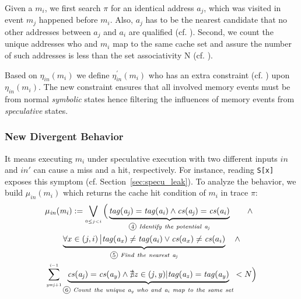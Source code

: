 \documentclass[sigconf]{acmart}
\newcommand*\circled[1]{\tikz[baseline=(char.base)]{
				\node[shape=circle,draw,inner sep=1pt] (char) {\scriptsize{#1}};}}
\begin{document}
Given a $\mathit{m_i}$, we first search $\pi$ for an identical address 
$\mathit{a_j}$, which was visited in event $\mathit{m_j}$ happened before 
$\mathit{m_i}$. Also, $\mathit{a_j}$ has to be the nearest candidate that 
no other addresses between $\mathit{a_j}$ and $\mathit{a_i}$ are qualified
(cf. \circled{1}). Second, we count the unique addresses who and $\mathit{m_i}$
map to the same cache set and assure the number of such addresses is less 
than the set associativity N (cf. \circled{2}).
%

Based on $\mathit{\eta_{in}(m_i)}$ we define $\mathit{\eta^\prime_{in}(m_i)}$
who has an extra constraint (cf. \circled{3}) upon $\mathit{\eta_{in}(m_i)}$. 
The new constraint ensures that all involved memory events must be from 
normal \textit{symbolic} states hence filtering the influences of memory 
events from \textit{speculative} states.

\subsubsection{New Divergent Behavior}
\label{sec:new_div}
It means executing $\mathit{m_i}$ under speculative execution with two different
inputs $\mathit{in}$ and $\mathit{in'}$ can cause a miss and a hit, respectively. 
For instance, reading \texttt{S[x]} exposes this symptom (cf. Section~\ref{sec:specu_leak}). 
To analyze the behavior, we build $\mathit{\mu_{in}(m_i)}$ which returns the cache
hit condition of $\mathit{m_i}$ in trace $\pi$:
%
%
\begin{multline}
  \label{eqn:hc}
    \mathit{\mu_{in}(m_i)}:=
    \bigvee_{{\scriptscriptstyle 0{\leq}j<i}}
    \Big(
    \underbrace{
      \mathit{tag(a_j)}=\mathit{tag(a_i)} 
			\wedge 
      \mathit{cs(a_j)}=\mathit{cs(a_i)} 
    }_{{\circled{4}}\mathit{~Identify~the~potential~a_j}}
    ~~~~~~\wedge 
		~~\\
    \underbrace{
      {\forall}x\in\left(j,i\right)\big |\mathit{tag(a_x)}\ne\mathit{tag(a_i)}
      \vee 
      \mathit{cs}(a_x)\ne\mathit{cs}(a_i)
    }_{{\circled{5}}\mathit{~Find~the~nearest~a_j}}
		~~~\wedge 
		\\
    \sum_{{\scriptscriptstyle \mathit{y=j}+1}}^{{\scriptscriptstyle \mathit{i-}1}} 
    \underbrace{
      \mathit{cs(a_j)}=\mathit{cs(a_y)} 
      \wedge
      \nexists\mathit{z}\in(\mathit{j,y})|\mathit{tag(a_z)}=\mathit{tag(a_y)}
    }_{{\circled{6}}\mathit{~Count~the~unique~a_y~who~and~a_i~map~to~the~same~set}}
    <N 
    \Big)
\end{multline}
\vspace{.8ex}
%
%
\end{document}
